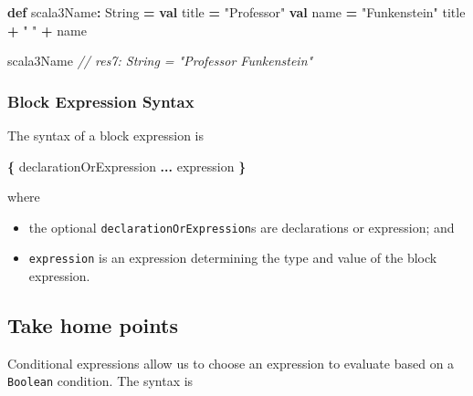 \documentclass[11pt,a5paper,]{book}
\newenvironment{Shaded}{\begin{snugshade}}{\end{snugshade}}
\newcommand{\CommentTok}[1]{\textcolor[rgb]{0.56,0.35,0.01}{\textit{#1}}}
\newcommand{\ExtensionTok}[1]{#1}
\newcommand{\KeywordTok}[1]{\textcolor[rgb]{0.13,0.29,0.53}{\textbf{#1}}}
\newcommand{\NormalTok}[1]{#1}
\newcommand{\OperatorTok}[1]{\textcolor[rgb]{0.81,0.36,0.00}{\textbf{#1}}}
\newcommand{\StringTok}[1]{\textcolor[rgb]{0.31,0.60,0.02}{#1}}
\providecommand{\tightlist}{%
  \setlength{\itemsep}{0pt}\setlength{\parskip}{0pt}}
\begin{document}
\begin{Shaded}
\begin{Highlighting}[]
\KeywordTok{def}\NormalTok{ scala3Name}\OperatorTok{:} \ExtensionTok{String} \OperatorTok{=} 
  \KeywordTok{val}\NormalTok{ title }\OperatorTok{=} \StringTok{"Professor"}
  \KeywordTok{val}\NormalTok{ name }\OperatorTok{=} \StringTok{"Funkenstein"}
\NormalTok{  title }\OperatorTok{+} \StringTok{" "} \OperatorTok{+}\NormalTok{ name}
\end{Highlighting}
\end{Shaded}

\begin{Shaded}
\begin{Highlighting}[]
\NormalTok{scala3Name}
\CommentTok{// res7: String = "Professor Funkenstein"}
\end{Highlighting}
\end{Shaded}

\hypertarget{block-expression-syntax}{%
\subsubsection*{Block Expression Syntax}\label{block-expression-syntax}}

The syntax of a block expression is

\begin{Shaded}
\begin{Highlighting}[]
\OperatorTok{\{}
\NormalTok{   declarationOrExpression }\OperatorTok{...}
\NormalTok{   expression}
\OperatorTok{\}}
\end{Highlighting}
\end{Shaded}

where

\begin{itemize}
\tightlist
\item
  the optional \texttt{declarationOrExpression}s are declarations or
  expression; and
\item
  \texttt{expression} is an expression determining the type and value of
  the block expression.
\end{itemize}

\hypertarget{take-home-points-4}{%
\subsection{Take home points}\label{take-home-points-4}}

Conditional expressions allow us to choose an expression to evaluate
based on a \texttt{Boolean} condition. The syntax is
\end{document}
